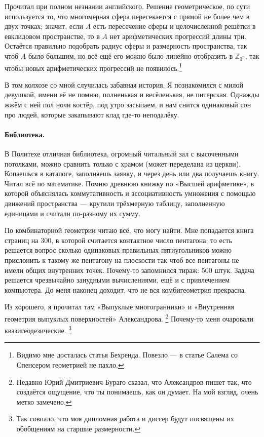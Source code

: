\documentclass{book}
\begin{document}
Прочитал при полном незнании английского.
Решение геометрическое, по сути используется то, 
что многомерная сфера пересекается с прямой не более чем в двух точках;
значит, если $A$ есть пересечение сферы и целочисленной решётки в евклидовом пространстве,
то в $A$ нет арифметических прогрессий длины три.
Остаётся правильно подобрать радиус сферы и размерность пространства,
так чтоб $A$ было большим,
но всё ещё его можно было 
линейно отобразить в $\mathbb{Z}_{3^n}$, так чтобы новых арифметических прогрессий не появилось.\footnote{Видимо мне досталась статья Бехренда.
Повезло --- в статье Салема со Спенсером геометрией не пахло.}

В том колхозе со мной случилась забавная история. 
Я познакомился с милой девушкой, имени её не помню, полненькая и весёленькая, не питерская.
Однажды жжём с ней пол ночи костёр, 
под утро засыпаем, и нам снится одинаковый сон
про людей, которые закапывают клад где-то неподалёку.

\paragraph{Библиотека.}
В Политехе отличная библиотека, огромный читальный зал с высоченными потолками,
можно сравнить только с храмом (может переделана из церкви).
Копаешься в каталоге, заполняешь заявку, и через день или два получаешь книгу.
Читал всё по математике.
Помню древнюю книжку по «Высшей арифметике»,
в которой объяснялась коммутативность и ассоциативность умножения с помощью движений пространства --- крутили трёхмерную таблицу, заполненную единицами и считали по-разному их сумму.

По комбинаторной геометрии читаю всё, что могу найти.
Мне попадается книга страниц на 300,
в которой считается контактное число пентагона;
то есть решается вопрос сколько одинаковых правильных пятиугольников можно прислонить к такому же пентагону на плоскости так чтоб все пентагоны не имели общих внутренних точек.
Почему-то запомнился тираж: 500 штук.
Задача решается чрезвычайно занудными вычислениями, 
ещё и с привлечением компьютера.
До меня наконец доходит, что не вся комбигеометрия прекрасна.

Из хорошего, я прочитал там «Выпуклые многогранники» и «Внутренняя геометрия выпуклых поверхностей» Александрова.%
\footnote{Недавно Юрий Дмитриевич Бураго сказал, что Александров пишет так, что создаётся ощущение, что ты понимаешь, как он думает.
На мой взгляд, очень метко замечено.} 
Почему-то меня очаровали квазигеодезические.%
\footnote{Так совпало, что моя дипломная работа и диссер будут посвящены их обобщениям на старшие размерности.}
\end{document}
